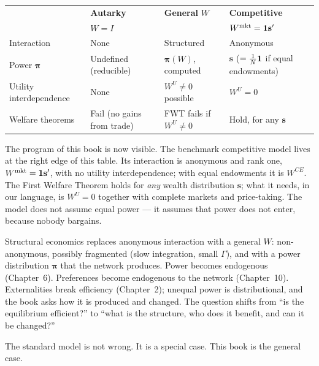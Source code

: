 \documentclass[../structural_economics_book.tex]{subfiles}
\begin{document}
\begin{center}
\small
\begin{tabularx}{\textwidth}{lLLL}
\toprule
& \textbf{Autarky} & \textbf{General} $W$ & \textbf{Competitive} \\
& $W = I$ & & $W^{\text{mkt}} = \mathbf{1}\mathbf{s}'$ \\
\midrule
Interaction & None & Structured & Anonymous \\
Power $\boldsymbol{\pi}$ & Undefined (reducible) & $\boldsymbol{\pi}(W)$, computed & $\mathbf{s}$ ($= \frac{1}{N}\mathbf{1}$ if equal endowments) \\
Utility interdependence & None & $W^U \neq 0$ possible & $W^U = 0$ \\
Welfare theorems & Fail (no gains from trade) & FWT fails if $W^U \neq 0$ & Hold, for any $\mathbf{s}$ \\
\bottomrule
\end{tabularx}
\end{center}

\begin{keyinsight}
The program of this book is now visible. The benchmark competitive model lives at the right edge of this table. Its interaction is anonymous and rank one, $W^{\text{mkt}} = \mathbf{1}\mathbf{s}'$, with no utility interdependence; with equal endowments it is $W^{CE}$. The First Welfare Theorem holds for \textit{any} wealth distribution $\mathbf{s}$; what it needs, in our language, is $W^U = 0$ together with complete markets and price-taking. The model does not assume equal power --- it assumes that power does not enter, because nobody bargains.

Structural economics replaces anonymous interaction with a general $W$: non-anonymous, possibly fragmented (slow integration, small $\Gamma$), and with a power distribution $\boldsymbol{\pi}$ that the network produces. Power becomes endogenous (Chapter~6). Preferences become endogenous to the network (Chapter~10). Externalities break efficiency (Chapter~2); unequal power is distributional, and the book asks how it is produced and changed. The question shifts from ``is the equilibrium efficient?'' to ``what is the structure, who does it benefit, and can it be changed?''

The standard model is not wrong. It is a special case. This book is the general case.
\end{keyinsight}
\end{document}
